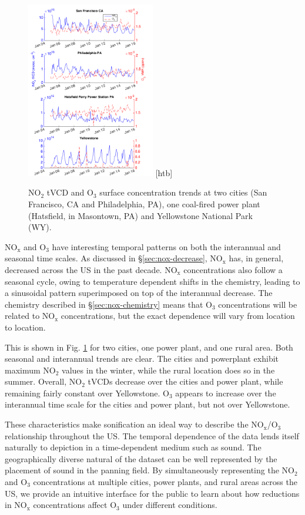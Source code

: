 \documentclass[a4paper,10pt,oneside]{article}
\newcommand{\ce}[1]{$\mathrm{#1}$}
\begin{document}
\begin{sloppy}
\begin{figure}
\centering
\includegraphics[width=0.5\textwidth]{figs/four-site-trends.png} [htb]
\caption{\ce{NO_2} tVCD and \ce{O_3} surface concentration trends at two cities (San Francisco, CA and Philadelphia, PA), one coal-fired power plant (Hatsfield, in Masontown, PA) and Yellowstone National Park (WY).}
\label{fig:trends}
\end{figure}

\ce{NO_x} and \ce{O_3} have interesting temporal patterns on both the interannual and seasonal time scales. As discussed in \S\ref{sec:nox-decrease}, \ce{NO_x} has, in general, decreased across the US in the past decade. \ce{NO_x} concentrations also follow a seasonal cycle, owing to temperature dependent shifts in the chemistry, leading to a sinusoidal pattern superimposed on top of the interannual decrease.  The chemistry described in \S\ref{sec:nox-chemistry} means that \ce{O_3} concentrations will be related to \ce{NO_x} concentrations, but the exact dependence will vary from location to location.

This is shown in Fig. \ref{fig:trends} for two cities, one power plant, and one rural area. Both seasonal and interannual trends are clear. The cities and powerplant exhibit maximum \ce{NO_2} values in the winter, while the rural location does so in the summer. Overall, \ce{NO_2} tVCDs decrease over the cities and power plant, while remaining fairly constant over Yellowstone. \ce{O_3} appears to increase over the interannual time scale for the cities and power plant, but not over Yellowstone. 

These characteristics make sonification an ideal way to describe the \ce{NO_x}/\ce{O_3} relationship throughout the US. The temporal dependence of the data lends itself naturally to depiction in a time-dependent medium such as sound. The geographically diverse natural of the dataset can be well represented by the placement of sound in the panning field. By simultaneously representing the \ce{NO_2} and \ce{O_3} concentrations at multiple cities, power plants, and rural areas across the US, we provide an intuitive interface for the public to learn about how reductions in \ce{NO_x} concentrations affect \ce{O_3} under different conditions.
	

\end{sloppy}
\end{document}
